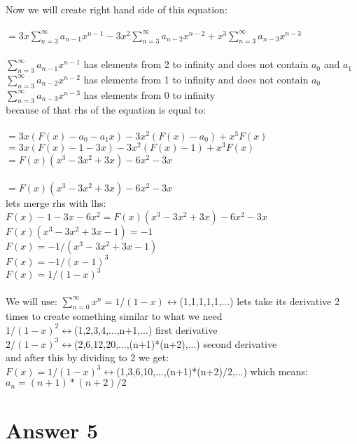 \documentclass[11pt]{article}
\begin{document}
Now we will create right hand side of this equation:\\
\\
$=3x\sum_{n=3}^{\infty}a_{n-1}x^{n-1}-3x^{2}\sum_{n=3}^{\infty}a_{n-2}x^{n-2}+x^{3}\sum_{n=3}^{\infty}a_{n-3}x^{n-3}$\\
\\
$\sum_{n=3}^{\infty}a_{n-1}x^{n-1}$ has elements from 2 to infinity and does not contain $a_{0}$ and $a_{1}$\\
$\sum_{n=3}^{\infty}a_{n-2}x^{n-2}$ has elements from 1 to infinity and does not contain $a_{0}$\\
$\sum_{n=3}^{\infty}a_{n-3}x^{n-3}$ has elements from 0 to infinity\\
because of that rhs of the equation is equal to:\\
\\
$=3x(F(x)-a_{0}-a_{1}x)-3x^{2}(F(x)-a_{0})+x^{3}F(x)$\\
$=3x(F(x)-1-3x)-3x^{2}(F(x)-1)+x^{3}F(x)$\\
$=F(x)(x^{3}-3x^{2}+3x)-6x^{2}-3x$\\
\\
$=F(x)(x^{3}-3x^{2}+3x)-6x^{2}-3x$\\
lets merge rhs with lhs:\\
$F(x)-1-3x-6x^{2}=F(x)(x^{3}-3x^{2}+3x)-6x^{2}-3x$\\
$F(x)(x^{3}-3x^{2}+3x-1)=-1$\\
$F(x)=-1/(x^{3}-3x^{2}+3x-1)$\\
$F(x)=-1/(x-1)^3$\\
$F(x)=1/(1-x)^3$\\
\\
We will use:
$\sum_{n=0}^{\infty}x^{n}=1/(1-x)\leftrightarrow$(1,1,1,1,1,...) lets take its derivative 2 times to create something similar to what we need\\

$1/(1-x)^{2}\leftrightarrow$(1,2,3,4,...,n+1,...)    first derivative\\
$2/(1-x)^{3}\leftrightarrow$(2,6,12,20,...,(n+1)*(n+2),...)    second derivative\\
and after this by dividing to 2 we get:\\
$F(x)=1/(1-x)^{3}\leftrightarrow$(1,3,6,10,...,(n+1)*(n+2)/2,...)
which means:\\
$a_n=(n+1)*(n+2)/2$\\




\section*{Answer 5}
\end{document}
